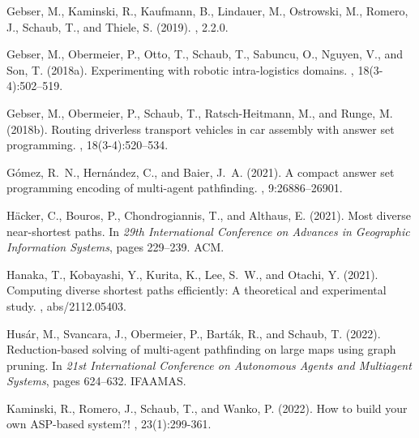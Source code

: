 \begin{thebibliography}{}

Gebser, M., Kaminski, R., Kaufmann, B., Lindauer, M., Ostrowski, M., Romero, J., Schaub, T., and Thiele, S. (2019).
, 2.2.0.

Gebser, M., Obermeier, P., Otto, T., Schaub, T., Sabuncu, O., Nguyen, V., and Son, T. (2018a).
\newblock Experimenting with robotic intra-logistics domains.
, 18(3-4):502--519.

Gebser, M., Obermeier, P., Schaub, T., Ratsch{-}Heitmann, M., and Runge, M. (2018b).
\newblock Routing driverless transport vehicles in car assembly with answer set programming.
, 18(3-4):520--534.

G{\'{o}}mez, R.~N., Hern{\'{a}}ndez, C., and Baier, J.~A. (2021).
\newblock A compact answer set programming encoding of multi-agent pathfinding.
, 9:26886--26901.

H{\"{a}}cker, C., Bouros, P., Chondrogiannis, T., and Althaus, E. (2021).
\newblock Most diverse near-shortest paths.
\newblock In
{\em 29th International Conference on Advances in Geographic Information Systems},
pages 229--239. {ACM}.

Hanaka, T., Kobayashi, Y., Kurita, K., Lee, S.~W., and Otachi, Y. (2021).
\newblock Computing diverse shortest paths efficiently: {A} theoretical and experimental study.
, abs/2112.05403.

Hus{\'{a}}r, M., Svancara, J., Obermeier, P., Bart{\'{a}}k, R., and Schaub, T.  (2022).
\newblock Reduction-based solving of multi-agent pathfinding on large maps using graph pruning.
\newblock In
{\em 21st International Conference on Autonomous Agents and Multiagent Systems},
pages 624--632.
IFAAMAS. %

Kaminski, R., Romero, J., Schaub, T., and Wanko, P. (2022).
\newblock How to build your own ASP-based system?!
, 23(1):299-361.


\end{thebibliography}

